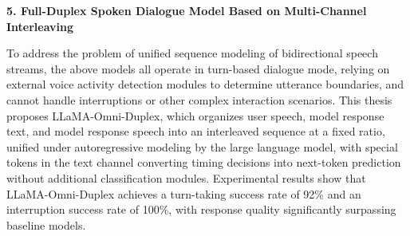 \textbf{5. Full-Duplex Spoken Dialogue Model Based on Multi-Channel Interleaving}

To address the problem of unified sequence modeling of bidirectional speech streams, the above models all operate in turn-based dialogue mode, relying on external voice activity detection modules to determine utterance boundaries, and cannot handle interruptions or other complex interaction scenarios. This thesis proposes LLaMA-Omni-Duplex, which organizes user speech, model response text, and model response speech into an interleaved sequence at a fixed ratio, unified under autoregressive modeling by the large language model, with special tokens in the text channel converting timing decisions into next-token prediction without additional classification modules. Experimental results show that LLaMA-Omni-Duplex achieves a turn-taking success rate of 92\% and an interruption success rate of 100\%, with response quality significantly surpassing baseline models.


\pagestyle{enfrontmatterstyle}%
\cleardoublepage\pagestyle{frontmatterstyle}%

